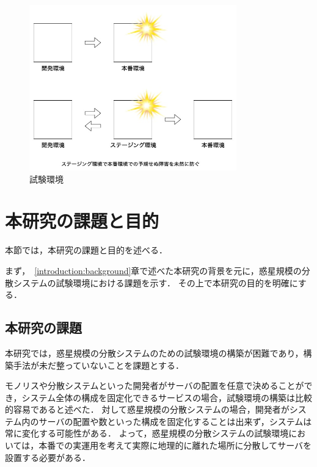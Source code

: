\begin{figure}[htbp]
  \begin{center}
    \includegraphics[width=0.8\textwidth]{./figures/staging.jpg}
    \caption{試験環境}
  \end{center}
\end{figure}

\section{本研究の課題と目的}
\label{introduction:issue-aim}

本節では，本研究の課題と目的を述べる．

まず，~\ref{introduction:background}章で述べた本研究の背景を元に，惑星規模の分散システムの試験環境における課題を示す．
その上で本研究の目的を明確にする．

\subsection{本研究の課題}
\label{introduction:issue-aim:issue}

本研究では，惑星規模の分散システムのための試験環境の構築が困難であり，構築手法が未だ整っていないことを課題とする．

モノリスや分散システムといった開発者がサーバの配置を任意で決めることができ，システム全体の構成を固定化できるサービスの場合，試験環境の構築は比較的容易であると述べた．
対して惑星規模の分散システムの場合，開発者がシステム内のサーバの配置や数といった構成を固定化することは出来ず，システムは常に変化する可能性がある．
よって，惑星規模の分散システムの試験環境においては，本番での実運用を考えて実際に地理的に離れた場所に分散してサーバを設置する必要がある．


